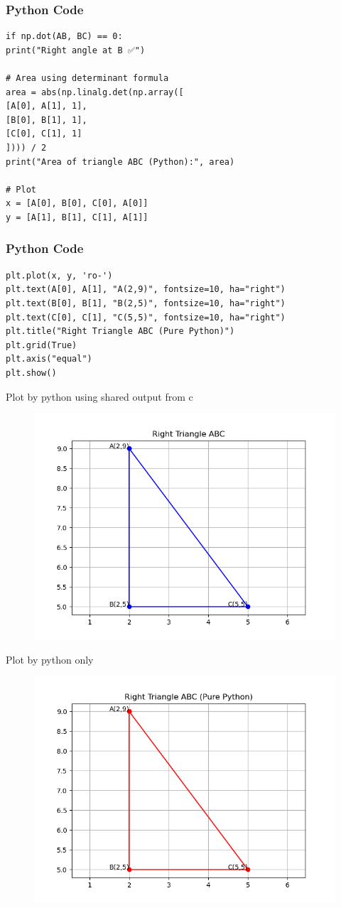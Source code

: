 \documentclass{beamer}
\begin{document}
\begin{frame}[fragile]
	\frametitle{Python Code}
	\begin{lstlisting}
if np.dot(AB, BC) == 0:
print("Right angle at B ✅")

# Area using determinant formula
area = abs(np.linalg.det(np.array([
[A[0], A[1], 1],
[B[0], B[1], 1],
[C[0], C[1], 1]
]))) / 2
print("Area of triangle ABC (Python):", area)

# Plot
x = [A[0], B[0], C[0], A[0]]
y = [A[1], B[1], C[1], A[1]]
	\end{lstlisting}
\end{frame}

\begin{frame}[fragile]
	\frametitle{Python Code}
	\begin{lstlisting}
plt.plot(x, y, 'ro-')
plt.text(A[0], A[1], "A(2,9)", fontsize=10, ha="right")
plt.text(B[0], B[1], "B(2,5)", fontsize=10, ha="right")
plt.text(C[0], C[1], "C(5,5)", fontsize=10, ha="right")
plt.title("Right Triangle ABC (Pure Python)")
plt.grid(True)
plt.axis("equal")
plt.show()
	\end{lstlisting}
\end{frame}

\begin{frame}{Plot by python using shared output from c}
	\begin{center}
	\begin{figure}[H]
		\centering
		\includegraphics[width = 0.6\columnwidth]{figs/Figure_1.png}
		\caption*{}
		\label{}
	\end{figure}
	\end{center}
\end{frame}

\begin{frame}{Plot by python only}
	\begin{center}
		\begin{figure}[H]
			\centering
			\includegraphics[width = 0.6\columnwidth]{figs/Figure_2.png}
			\caption*{}
			\label{}
		\end{figure}
	\end{center}
\end{frame}
\end{document}
